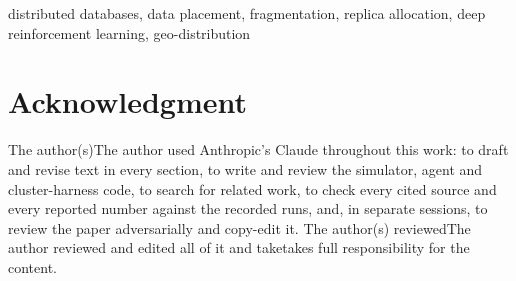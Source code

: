 \documentclass[conference]{IEEEtran}
\begin{document}
\begin{IEEEkeywords}
distributed databases, data placement, fragmentation, replica allocation,
deep reinforcement learning, geo-distribution
\end{IEEEkeywords}







\section*{Acknowledgment}
\ifanonymous The author(s)\else The author\fi{} used Anthropic's Claude throughout this work: to draft and revise text in
every section, to write and review the simulator, agent and cluster-harness
code, to search for related work, to check every cited source and every
reported number against the recorded runs, and, in separate sessions, to
review the paper adversarially and copy-edit it. \ifanonymous The author(s) reviewed\else The author reviewed\fi{} and edited all of it and
\ifanonymous take\else takes\fi{} full responsibility for the content.



\end{document}

